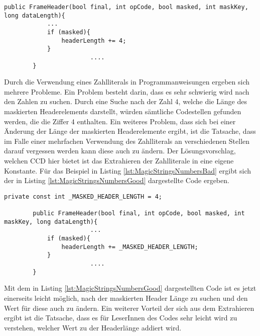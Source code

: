 \begin{lstlisting}[language={[Sharp]C}, caption=Magische Zahl, label=lst:MagicStringsNumbersBad]
        public FrameHeader(bool final, int opCode, bool masked, int maskKey, long dataLength){
           	...
            if (masked){
                headerLength += 4;
            }
						....
        }
\end{lstlisting}

\SuperPar Durch die Verwendung eines Zahlliterals in Programmanweisungen ergeben sich mehrere Probleme. Ein Problem besteht darin, dass es sehr schwierig wird nach den Zahlen zu suchen. Durch eine Suche nach der Zahl 4, welche die Länge des maskierten Headerelements darstellt, würden sämtliche Codestellen gefunden werden, die die Ziffer 4 enthalten. Ein weiteres Problem, dass sich bei einer Änderung der Länge der maskierten Headerelemente ergibt, ist die Tatsache, dass im Falle einer mehrfachen Verwendung des Zahlliterals an verschiedenen Stellen darauf vergessen werden kann diese auch zu ändern. Der Lösungsvorschlag, welchen CCD hier bietet ist das Extrahieren der Zahlliterale in eine eigene Konstante. Für das Beispiel in Listing \ref{lst:MagicStringsNumbersBad}  ergibt sich der in Listing \ref{lst:MagicStringsNumbersGood} dargestellte Code ergeben.

\begin{lstlisting}[language={[Sharp]C}, caption=Konstante statt einer magischen Zahl, label=lst:MagicStringsNumbersGood]
				private const int _MASKED_HEADER_LENGTH = 4;
	
        public FrameHeader(bool final, int opCode, bool masked, int maskKey, long dataLength){
						...
            if (masked){
                headerLength += _MASKED_HEADER_LENGTH;
            }
						....
        }
\end{lstlisting}

\SuperPar Mit dem in Listing \ref{lst:MagicStringsNumbersGood} dargestellten Code ist es jetzt einerseits leicht möglich, nach der maskierten Header Länge zu suchen und den Wert für diese auch zu ändern. Ein weiterer Vorteil der sich aus dem Extrahieren ergibt ist die Tatsache, dass es für LeserInnen des Codes sehr leicht wird zu verstehen, welcher Wert zu der Headerlänge addiert wird. 




